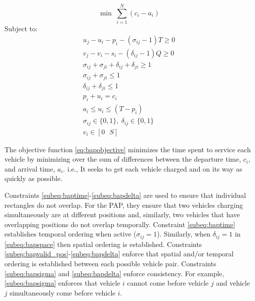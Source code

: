\documentclass[utf8]{FrontiersinHarvard}
\begin{document}
\begin{equation}
	\label{eq:bapobjective}
	\min\; \sum_{i=1}^N (c_i - a_i)
\end{equation}
Subject to:
\begin{subequations}
\label{eq:bapconstrs}
\begin{align}
    u_j - u_i - p_i - (\sigma_{ij} - 1)T \geq 0                  \label{subeq:baptime}          \\
    v_j - v_i - s_i - (\delta_{ij} - 1)Q \geq 0                  \label{subeq:bapspace}         \\
    \sigma_{ij} + \sigma_{ji} + \delta_{ij} + \delta_{ji} \geq 1 \label{subeq:bapvalid_pos}     \\
    \sigma_{ij} + \sigma_{ji} \leq 1                              \label{subeq:bapsigma}        \\
    \delta_{ij} + \delta_{ji} \leq 1                              \label{subeq:bapdelta}        \\
    p_i + u_i = c_i                                               \label{subeq:bapdetach}       \\
    a_i \leq u_i \leq (T - p_i)                                   \label{subeq:bapvalid_starts} \\
    \sigma_{ij} \in \{0,1\},\;\delta_{ij} \in \{0,1\}\;           \label{subeq:bapsdspace}      \\
    v_i \in [0 \mbox{ } S ]                                       \label{subeq:bapvspace}
\end{align}
\end{subequations}

\noindent

The objective function \eqref{eq:bapobjective} minimizes the time spent to service each vehicle by minimizing over the
sum of differences between the departure time, $c_i$, and arrival time, $a_i$. i.e., It seeks to get each vehicle
charged and on its way as quickly as possible.

Constraints \ref{subeq:baptime}-\ref{subeq:bapdelta} are used to ensure that individual rectangles do not overlap. For
the PAP, they ensure that two vehicles charging simultaneously are at different positions and, similarly, two vehicles
that have overlapping positions do not overlap temporally. Constraint \eqref{subeq:baptime} establishes temporal
ordering when active ($\sigma_{ij}=1$). Similarly, when $\delta_{ij} =1$ in \eqref{subeq:bapspace} then spatial ordering is
established. Constraints \ref{subeq:bapvalid_pos}-\ref{subeq:bapdelta} enforce that spatial and/or temporal ordering is
established between each possible vehicle pair. Constraints \eqref{subeq:bapsigma} and \eqref{subeq:bapdelta} enforce
consistency. For example, \eqref{subeq:bapsigma} enforces that vehicle $i$ cannot come before vehicle $j$ and vehicle
$j$ simultaneously come before vehicle $i$.
\end{document}
